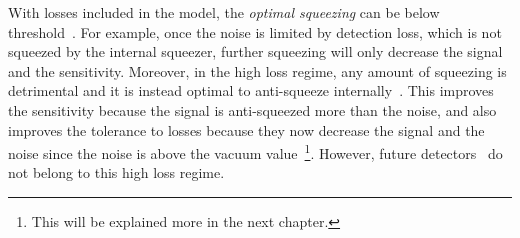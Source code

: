 With losses included in the model, the \emph{optimal squeezing} can be below threshold~\cite{korobkoCompensatingQuantumDecoherenceTalk2021}. For example, once the noise is limited by detection loss, which is not squeezed by the internal squeezer, further squeezing will only decrease the signal and the sensitivity. Moreover, in the high loss regime, any amount of squeezing is detrimental and it is instead optimal to anti-squeeze internally~\cite{korobkoCompensatingQuantumDecoherenceTalk2021}. This improves the sensitivity because the signal is anti-squeezed more than the noise, and also improves the tolerance to losses because they now decrease the signal and the noise since the noise is above the vacuum value~\footnote{This will be explained more in the next chapter.}. However, future detectors~\cite{} do not belong to this high loss regime. %


